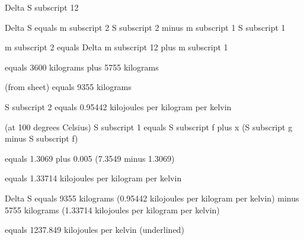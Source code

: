 Delta S subscript 12  

Delta S equals m subscript 2 S subscript 2 minus m subscript 1 S subscript 1  

m subscript 2 equals Delta m subscript 12 plus m subscript 1  

equals 3600 kilograms plus 5755 kilograms  

(from sheet) equals 9355 kilograms  

S subscript 2 equals 0.95442 kilojoules per kilogram per kelvin  

(at 100 degrees Celsius) S subscript 1 equals S subscript f plus x (S subscript g minus S subscript f)  

equals 1.3069 plus 0.005 (7.3549 minus 1.3069)  

equals 1.33714 kilojoules per kilogram per kelvin  

Delta S equals 9355 kilograms (0.95442 kilojoules per kilogram per kelvin) minus 5755 kilograms (1.33714 kilojoules per kilogram per kelvin)  

equals 1237.849 kilojoules per kelvin (underlined)